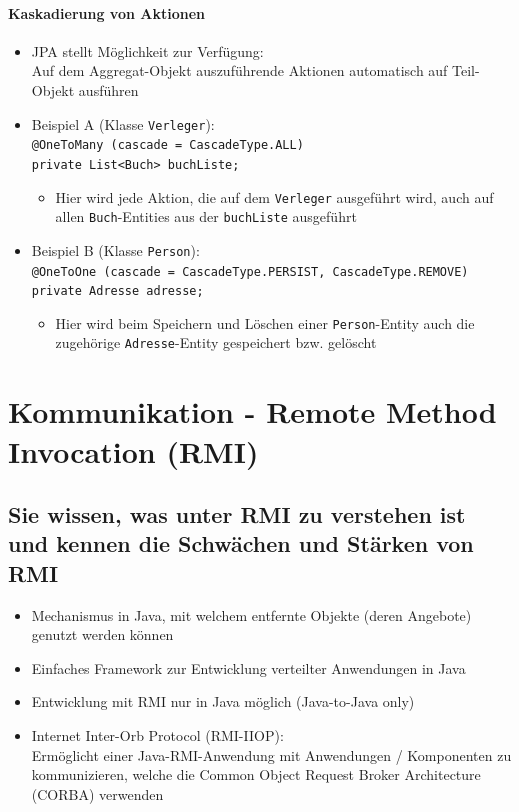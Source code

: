 \documentclass[a4paper]{article}
\begin{document}
				\paragraph{Kaskadierung von Aktionen}
				
					\begin{itemize}
						\item JPA stellt Möglichkeit zur Verfügung:\\
						Auf dem Aggregat-Objekt auszuführende Aktionen automatisch auf Teil-Objekt ausführen
						\item Beispiel A (Klasse \texttt{Verleger}):\\
						\texttt{@OneToMany (cascade = CascadeType.ALL)\\
						private List<Buch> buchListe;}
							\begin{itemize}
								\item Hier wird jede Aktion, die auf dem \texttt{Verleger} ausgeführt wird, auch auf allen \texttt{Buch}-Entities aus der \texttt{buchListe} ausgeführt
							\end{itemize}
						\item Beispiel B (Klasse \texttt{Person}):\\
						\texttt{@OneToOne (cascade = {CascadeType.PERSIST, CascadeType.REMOVE})\\
						private Adresse adresse;}
							\begin{itemize}
								\item Hier wird beim Speichern und Löschen einer \texttt{Person}-Entity auch die zugehörige \texttt{Adresse}-Entity gespeichert bzw. gelöscht
							\end{itemize}
					\end{itemize}
		
	\newpage
	\section{Kommunikation - Remote Method Invocation (RMI)}
	
		
		\subsection{Sie wissen, was unter RMI zu verstehen ist und kennen die Schwächen und Stärken von RMI}
		
		\begin{itemize}
			\item Mechanismus in Java, mit welchem entfernte Objekte (deren Angebote) genutzt werden können
			\item Einfaches Framework zur Entwicklung verteilter Anwendungen in Java
			\item Entwicklung mit RMI nur in Java möglich (Java-to-Java only)
			\item Internet Inter-Orb Protocol (RMI-IIOP):\\
			Ermöglicht einer Java-RMI-Anwendung mit Anwendungen / Komponenten zu kommunizieren, welche die Common Object Request Broker Architecture (CORBA) verwenden
		\end{itemize}
	
\end{document}
